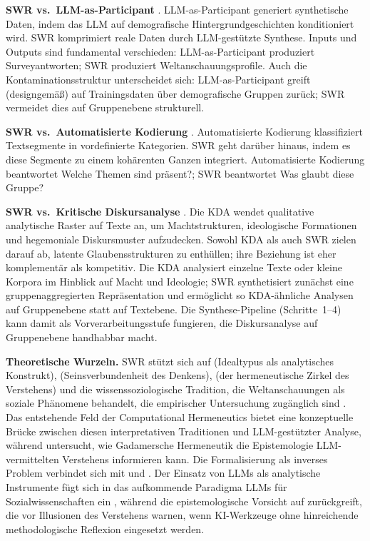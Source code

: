 \documentclass[11pt,a4paper]{article}
\begin{document}
\textbf{SWR vs.\ LLM-as-Participant} \citep{Argyle2023}. LLM-as-Participant generiert synthetische Daten, indem das LLM auf demografische Hintergrundgeschichten konditioniert wird. SWR komprimiert reale Daten durch LLM-gest\"utzte Synthese. Inputs und Outputs sind fundamental verschieden: LLM-as-Participant produziert Surveyantworten; SWR produziert Weltanschauungsprofile. Auch die Kontaminationsstruktur unterscheidet sich: LLM-as-Participant greift (designgem\"a\ss{}) auf Trainingsdaten \"uber demografische Gruppen zur\"uck; SWR vermeidet dies auf Gruppenebene strukturell.

\textbf{SWR vs.\ Automatisierte Kodierung} \citep{Tai2024}. Automatisierte Kodierung klassifiziert Textsegmente in vordefinierte Kategorien. SWR geht dar\"uber hinaus, indem es diese Segmente zu einem koh\"arenten Ganzen integriert. Automatisierte Kodierung beantwortet \glqq{}Welche Themen sind pr\"asent?\grqq{}; SWR beantwortet \glqq{}Was glaubt diese Gruppe?\grqq{}

\textbf{SWR vs.\ Kritische Diskursanalyse} \citep[KDA;][]{Fairclough1992, Wodak2001}. Die KDA wendet qualitative analytische Raster auf Texte an, um Machtstrukturen, ideologische Formationen und hegemoniale Diskursmuster aufzudecken. Sowohl KDA als auch SWR zielen darauf ab, latente Glaubensstrukturen zu enth\"ullen; ihre Beziehung ist eher komplement\"ar als kompetitiv. Die KDA analysiert einzelne Texte oder kleine Korpora im Hinblick auf Macht und Ideologie; SWR synthetisiert zun\"achst eine gruppenaggregierten Repr\"asentation und erm\"oglicht so KDA-\"ahnliche Analysen auf Gruppenebene statt auf Textebene. Die Synthese-Pipeline (Schritte~1--4) kann damit als Vorverarbeitungsstufe fungieren, die Diskursanalyse auf Gruppenebene handhabbar macht.

\textbf{Theoretische Wurzeln.} SWR st\"utzt sich auf \citet{Weber1904} (Idealtypus als analytisches Konstrukt), \citet{Mannheim1929} (Seinsverbundenheit des Denkens), \citet{Gadamer1960} (der hermeneutische Zirkel des Verstehens) und die wissenssoziologische Tradition, die Weltanschauungen als soziale Ph\"anomene behandelt, die empirischer Untersuchung zug\"anglich sind \citep{BergerLuckmann1966}. Das entstehende Feld der Computational Hermeneutics \citep{Kommers2026} bietet eine konzeptuelle Br\"ucke zwischen diesen interpretativen Traditionen und LLM-gest\"utzter Analyse, w\"ahrend \citet{Hornby2024} untersucht, wie Gadamersche Hermeneutik die Epistemologie LLM-vermittelten Verstehens informieren kann. Die Formalisierung als inverses Problem verbindet sich mit \citet{Tarantola2005} und \citet{Hadamard1923}. Der Einsatz von LLMs als analytische Instrumente f\"ugt sich in das aufkommende Paradigma \glqq{}LLMs f\"ur Sozialwissenschaften\grqq{} ein \citep{Ziems2024, Bail2024}, w\"ahrend die epistemologische Vorsicht auf \citet{Messeri2024} zur\"uckgreift, die vor \glqq{}Illusionen des Verstehens\grqq{} warnen, wenn KI-Werkzeuge ohne hinreichende methodologische Reflexion eingesetzt werden.
\end{document}
